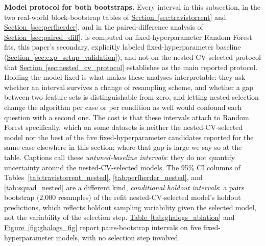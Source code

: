 \documentclass[technologies,article,submit,pdftex,moreauthors]{Definitions/mdpi}
\begin{document}
\textbf{Model protocol for both bootstraps.} Every interval in this subsection, in the two real-world block-bootstrap tables of \hyperref[sec:travistorrent]{Section~\ref*{sec:travistorrent}} and \hyperref[sec:perfherder]{Section~\ref*{sec:perfherder}}, and in the paired-difference analysis of \hyperref[sec:paired_diff]{Section~\ref*{sec:paired_diff}}, is computed on fixed-hyperparameter Random Forest fits, this paper's secondary, explicitly labeled fixed-hyperparameter baseline (\hyperref[sec:exp_setup_validation]{Section~\ref*{sec:exp_setup_validation}}), and not on the nested-CV-selected protocol that \hyperref[sec:nested_cv_protocol]{Section~\ref*{sec:nested_cv_protocol}} establishes as the main reported protocol. Holding the model fixed is what makes these analyses interpretable: they ask whether an interval survives a change of resampling scheme, and whether a gap between two feature sets is distinguishable from zero, and letting nested selection change the algorithm per case or per condition as well would confound each question with a second one. The cost is that these intervals attach to Random Forest specifically, which on some datasets is neither the nested-CV-selected model nor the best of the five fixed-hyperparameter candidates reported for the same case elsewhere in this section; where that gap is large we say so at the table. Captions call these \emph{untuned-baseline intervals}: they do not quantify uncertainty around the nested-CV-selected models. The 95\% CI columns of Tables~\ref{tab:travistorrent_nested}, \ref{tab:perfherder_nested}, and \ref{tab:squad_nested} are a different kind, \emph{conditional holdout intervals}: a pairs bootstrap (2,000 resamples) of the refit nested-CV-selected model's holdout predictions, which reflects holdout sampling variability given the selected model, not the variability of the selection step. \hyperref[tab:ghalogs_ablation]{Table~\ref*{tab:ghalogs_ablation}} and \hyperref[fig:ghalogs_fig]{Figure~\ref*{fig:ghalogs_fig}} report pairs-bootstrap intervals on five fixed-hyperparameter models, with no selection step involved.
\end{document}
